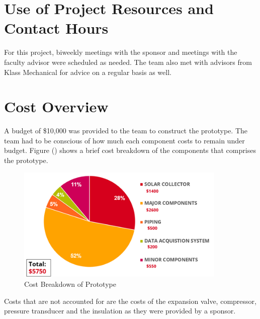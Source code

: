 \section{Use of Project Resources and Contact Hours}
For this project, biweekly meetings with the sponsor and meetings with the faculty advisor were scheduled as needed. The team also met with advisors from Klass Mechanical for advice on a regular basis as well.

\section{Cost Overview}
A budget of \$10,000 was provided to the team to construct the prototype. The team had to be conscious of how much each component costs to remain under budget. Figure () shows a brief cost breakdown of the components that comprises the prototype.

\medskip
\begin{figure}[H]
    \centering
    \includegraphics[width=10cm]{images/cost_breakdown.png}
    \caption{Cost Breakdown of Prototype}
\end{figure}

\medskip
Costs that are not accounted for are the costs of the expansion valve, compressor, pressure transducer and the insulation as they were provided by a sponsor.